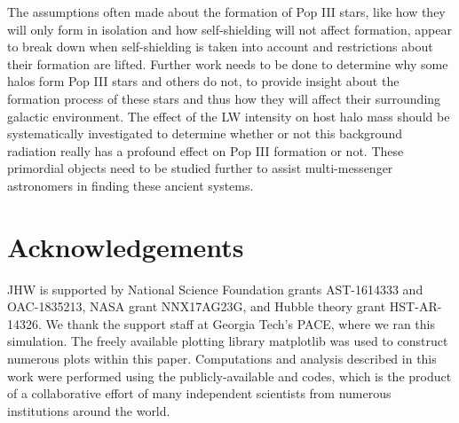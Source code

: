 \documentclass[a4paper,fleqn,usenatbib]{mnras}
\begin{document}
The assumptions often made about the formation of Pop III stars, like how they will only form in isolation and how \hh{} self-shielding will not affect formation, appear to break down when self-shielding is taken into account and restrictions about their formation are lifted. Further work needs to be done to determine why some halos form Pop III stars and others do not, to provide insight about the formation process of these stars and thus how they will affect their surrounding galactic environment. The effect of the LW intensity on host halo mass should be systematically investigated to determine whether or not this background radiation really has a profound effect on Pop III formation or not. These primordial objects need to be studied further to assist multi-messenger astronomers in finding these ancient systems.

\section*{Acknowledgements}

JHW is supported by National Science Foundation grants AST-1614333 and OAC-1835213, NASA grant NNX17AG23G, and Hubble theory grant
HST-AR-14326.  We thank the support staff at Georgia Tech's PACE,
where we ran this simulation.  The freely available plotting library
{\sc matplotlib} \citep{matplotlib} was used to construct numerous
plots within this paper. Computations and analysis described in this
work were performed using the publicly-available \enzo{} and \yt{}
codes, which is the product of a collaborative effort of many
independent scientists from numerous institutions around the world.










\appendix



\bsp	%
\label{lastpage}
\end{document}

